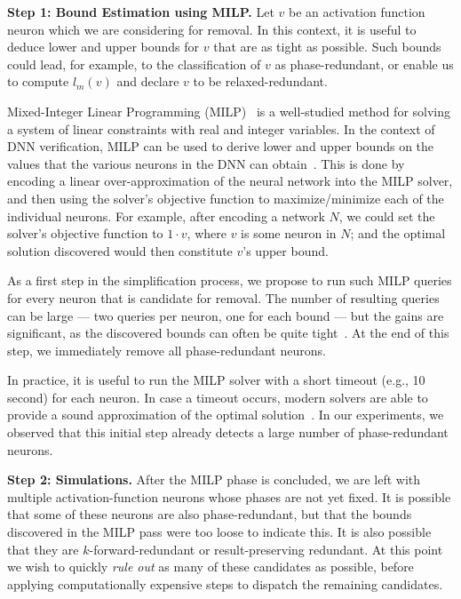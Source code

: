 \documentclass[10pt, conference, twocolumn, compsocconf]{IEEEtran}
\theoremstyle{remark}
\newcommand{\kfr}{$k$-forward-redundant}
\newcommand{\errorMinimizerFunction}{l_m}
\begin{document}
\medskip
\noindent
\textbf{Step 1: Bound Estimation using MILP.}
Let $v$ be an activation function neuron which we are considering for
removal. In this context, it is useful to deduce lower and upper
bounds for $v$ that are as tight as possible. Such bounds could lead,
for example, to the classification of $v$ as phase-redundant, or
enable us to compute $\errorMinimizerFunction(v)$ and declare $v$ to
be relaxed-redundant.

Mixed-Integer Linear Programming (MILP)~\cite{Dantzig1963} is a
well-studied method for solving a system of linear constraints with
real and integer variables. In the context of DNN verification, MILP
can be used to derive lower and upper bounds on the values that the
various neurons in the DNN can obtain~\cite{Ehlers2017,TjXiTe17}. This
is done by encoding a linear over-approximation of the neural network
into the MILP solver, and then using the solver's objective function
to maximize/minimize each of the individual neurons. For example,
after encoding a network $N$, we could set the solver's objective
function to $1\cdot v$, where $v$ is some neuron in $N$; and the
optimal solution discovered would then constitute $v$'s upper bound.

As a first step in the simplification process, we propose to run such
MILP queries for every neuron that is candidate for removal. The
number of resulting queries can be large --- two queries per neuron,
one for each bound --- but the gains are significant, as the
discovered bounds can often be quite tight~\cite{TjXiTe17}. At the end
of this step, we immediately remove all phase-redundant neurons.

In practice, it is useful to run the MILP solver with a short timeout
(e.g., 10 second)
for each neuron. In case a timeout occurs, modern
solvers are able to provide a sound approximation of the optimal
solution~\cite{Gurobi}.  In our experiments, we observed that this
initial step already detects a large number of phase-redundant
neurons.
%
%

\medskip
\noindent
\textbf{Step 2: Simulations.}  After the MILP phase is concluded, we
are left with multiple activation-function neurons whose phases are
not yet fixed. It is possible that some of these neurons are also
phase-redundant, but that the bounds discovered in the MILP pass were
too loose to indicate this. It is also possible that they are \kfr{}
or result-preserving redundant.  At this point we wish to quickly
\emph{rule out} as many of these candidates as possible, before
applying computationally expensive steps to dispatch the remaining
candidates.
\end{document}
